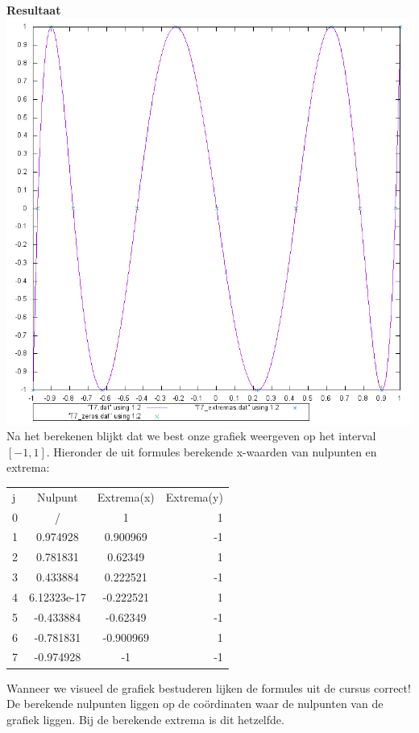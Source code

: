 \documentclass{article}
\begin{document}
\begin{flushleft}
\textbf{Resultaat}
\includegraphics[scale=0.6]{T7}
\newline
Na het berekenen blijkt dat we best onze grafiek weergeven op het interval $[-1, 1]$. Hieronder de uit formules berekende x-waarden van nulpunten en extrema:
\newline

\begin{tabular}{ l c c r}
  j & Nulpunt & Extrema(x) & Extrema(y) \\
  0 & / & 1 & 1 \\
  1 & 0.974928 &0.900969 & -1  \\
  2 & 0.781831 & 0.62349 & 1 \\
  3 & 0.433884 & 0.222521 & -1 \\
  4 & 6.12323e-17 & -0.222521 & 1   \\
  5 & -0.433884 & -0.62349 & -1  \\
  6 & -0.781831 & -0.900969 &  1 \\
  7 & -0.974928 & -1 & -1  \\  
\end{tabular}
\newline
\newline

Wanneer we visueel de grafiek bestuderen lijken de formules uit de cursus correct! De berekende nulpunten liggen op de coördinaten waar de nulpunten van de grafiek liggen. Bij de berekende extrema is dit hetzelfde.


\end{flushleft}
\end{document}
